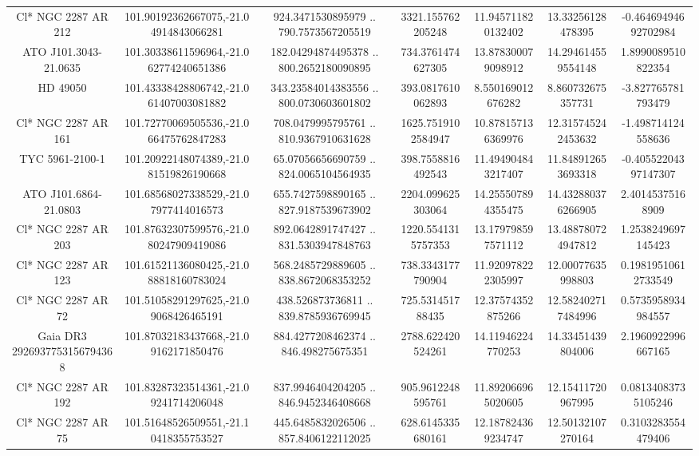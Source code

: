 \begin{table}
\begin{tabular}{ccccccc}
Cl* NGC 2287     AR     212 & 101.90192362667075,-21.04914843066281 & 924.3471530895979 .. 790.7573567205519 & 3321.155762205248 & 11.945711820132402 & 13.33256128478395 & -0.46469494692702984 \\
ATO J101.3043-21.0635 & 101.30338611596964,-21.062774240651386 & 182.04294874495378 .. 800.2652180090895 & 734.3761474627305 & 13.878300079098912 & 14.294614559554148 & 1.8990089510822354 \\
HD  49050 & 101.43338428806742,-21.061407003081882 & 343.23584014383556 .. 800.0730603601802 & 393.0817610062893 & 8.550169012676282 & 8.860732675357731 & -3.827765781793479 \\
Cl* NGC 2287     AR     161 & 101.72770069505536,-21.066475762847283 & 708.0479995795761 .. 810.9367910631628 & 1625.7519102584947 & 10.878157136369976 & 12.315745242453632 & -1.498714124558636 \\
TYC 5961-2100-1 & 101.20922148074389,-21.081519826190668 & 65.07056656690759 .. 824.0065104564935 & 398.7558816492543 & 11.494904843217407 & 11.848912653693318 & -0.40552204397147307 \\
ATO J101.6864-21.0803 & 101.68568027338529,-21.07977414016573 & 655.7427598890165 .. 827.9187539673902 & 2204.099625303064 & 14.255507894355475 & 14.432880376266905 & 2.40145375168909 \\
Cl* NGC 2287     AR     203 & 101.87632307599576,-21.080247909419086 & 892.0642891747427 .. 831.5303947848763 & 1220.5541315757353 & 13.179798597571112 & 13.488780724947812 & 1.2538249697145423 \\
Cl* NGC 2287     AR     123 & 101.61521136080425,-21.088818160783024 & 568.2485729889605 .. 838.8672068353252 & 738.3343177790904 & 11.920978222305997 & 12.00077635998803 & 0.19819510612733549 \\
Cl* NGC 2287     AR      72 & 101.51058291297625,-21.09068426465191 & 438.526873736811 .. 839.8785936769945 & 725.531451788435 & 12.37574352875266 & 12.582402717484996 & 0.5735958934984557 \\
Gaia DR3 2926937753156794368 & 101.87032183437668,-21.09162171850476 & 884.4277208462374 .. 846.498275675351 & 2788.622420524261 & 14.11946224770253 & 14.33451439804006 & 2.1960922996667165 \\
Cl* NGC 2287     AR     192 & 101.83287323514361,-21.09241714206048 & 837.9946404204205 .. 846.9452346408668 & 905.9612248595761 & 11.892066965020605 & 12.15411720967995 & 0.08134083735105246 \\
Cl* NGC 2287     AR      75 & 101.51648526509551,-21.10418355753527 & 445.6485832026506 .. 857.8406122112025 & 628.6145335680161 & 12.187824369234747 & 12.50132107270164 & 0.3103283554479406 \\

\end{tabular}
\end{table}
